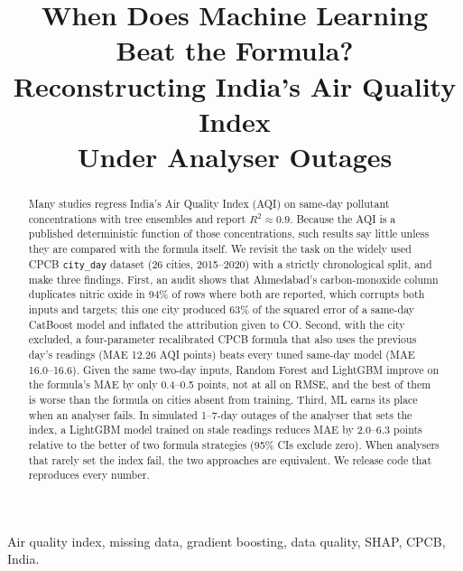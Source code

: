 \documentclass[conference]{IEEEtran}
\begin{document}
\title{When Does Machine Learning Beat the Formula?\\
Reconstructing India's Air Quality Index\\Under Analyser Outages}

\author{
}

\maketitle

\begin{abstract}
Many studies regress India's Air Quality Index (AQI) on same-day pollutant concentrations
with tree ensembles and report $R^2\approx0.9$. Because the AQI is a published deterministic
function of those concentrations, such results say little unless they are compared with the
formula itself. We revisit the task on the widely used CPCB \texttt{city\_day} dataset
(26 cities, 2015--2020) with a strictly chronological split, and make three findings.
First, an audit shows that Ahmedabad's carbon-monoxide column duplicates nitric oxide in
94\% of rows where both are reported, which corrupts both inputs and targets; this one city produced 63\% of the
squared error of a same-day CatBoost model and inflated the attribution given to CO.
Second, with the city excluded, a four-parameter recalibrated CPCB formula that also uses the
previous day's readings (MAE 12.26 AQI points) beats every tuned same-day model
(MAE 16.0--16.6). Given the same two-day inputs, Random Forest and LightGBM improve on the
formula's MAE by only 0.4--0.5 points, not at all on RMSE, and the best of them is worse than
the formula on cities absent from training.
Third, ML earns its place when an analyser fails. In simulated 1--7-day outages of the analyser
that sets the index, a LightGBM model trained on stale readings reduces MAE by 2.0--6.3 points
relative to the better of two formula strategies (95\% CIs exclude zero). When analysers that
rarely set the index fail, the two approaches are equivalent. We release code that reproduces
every number.
\end{abstract}

\begin{IEEEkeywords}
Air quality index, missing data, gradient boosting, data quality, SHAP, CPCB, India.
\end{IEEEkeywords}
\end{document}
